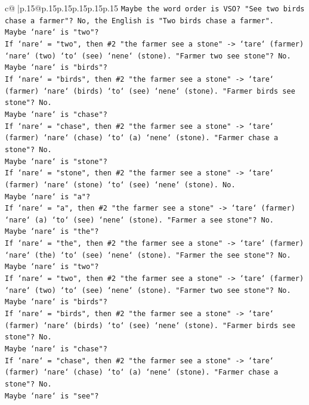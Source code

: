 \documentclass{article}
\begin{document}
{\begin{supertabular}{c@{$\;$}|p{.15\linewidth}@{}p{.15\linewidth}p{.15\linewidth}p{.15\linewidth}p{.15\linewidth}p{.15\linewidth}}
{{{\texttt{Maybe the word order is VSO? "See two birds chase a farmer"? No, the English is "Two birds chase a farmer".} \\
\texttt{Maybe `nare` is "two"?} \\
\texttt{If `nare` = "two", then \#2 "the farmer see a stone" {-}> `tare` (farmer) `nare` (two) `to` (see) `nene` (stone). "Farmer two see stone"? No.} \\
\texttt{Maybe `nare` is "birds"?} \\
\texttt{If `nare` = "birds", then \#2 "the farmer see a stone" {-}> `tare` (farmer) `nare` (birds) `to` (see) `nene` (stone). "Farmer birds see stone"? No.} \\
\texttt{Maybe `nare` is "chase"?} \\
\texttt{If `nare` = "chase", then \#2 "the farmer see a stone" {-}> `tare` (farmer) `nare` (chase) `to` (a) `nene` (stone). "Farmer chase a stone"? No.} \\
\texttt{Maybe `nare` is "stone"?} \\
\texttt{If `nare` = "stone", then \#2 "the farmer see a stone" {-}> `tare` (farmer) `nare` (stone) `to` (see) `nene` (stone). No.} \\
\texttt{Maybe `nare` is "a"?} \\
\texttt{If `nare` = "a", then \#2 "the farmer see a stone" {-}> `tare` (farmer) `nare` (a) `to` (see) `nene` (stone). "Farmer a see stone"? No.} \\
\texttt{Maybe `nare` is "the"?} \\
\texttt{If `nare` = "the", then \#2 "the farmer see a stone" {-}> `tare` (farmer) `nare` (the) `to` (see) `nene` (stone). "Farmer the see stone"? No.} \\
\texttt{Maybe `nare` is "two"?} \\
\texttt{If `nare` = "two", then \#2 "the farmer see a stone" {-}> `tare` (farmer) `nare` (two) `to` (see) `nene` (stone). "Farmer two see stone"? No.} \\
\texttt{Maybe `nare` is "birds"?} \\
\texttt{If `nare` = "birds", then \#2 "the farmer see a stone" {-}> `tare` (farmer) `nare` (birds) `to` (see) `nene` (stone). "Farmer birds see stone"? No.} \\
\texttt{Maybe `nare` is "chase"?} \\
\texttt{If `nare` = "chase", then \#2 "the farmer see a stone" {-}> `tare` (farmer) `nare` (chase) `to` (a) `nene` (stone). "Farmer chase a stone"? No.} \\
\texttt{Maybe `nare` is "see"?} \\
}}}
\end{supertabular}}
\end{document}
